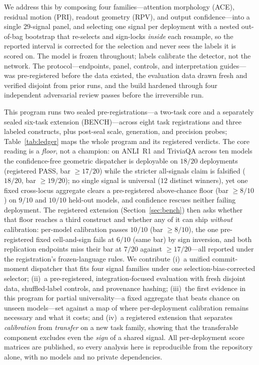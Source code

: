 \documentclass[11pt]{article}
\begin{document}
We address this by composing four families---attention morphology (ACE), residual motion
(PRI), readout geometry (RPV), and output confidence---into a single $29$-signal panel, and
selecting one signal per deployment with a nested out-of-bag bootstrap that re-selects and
sign-locks \emph{inside} each resample, so the reported interval is corrected for the selection
and never sees the labels it is scored on. The model is frozen throughout; labels calibrate the
detector, not the network. The protocol---endpoints, panel, controls, and interpretation
guides---was pre-registered before the data existed, the evaluation data drawn fresh and verified
disjoint from prior runs, and the build hardened through four independent adversarial review
passes before the irreversible run.

This program runs two sealed pre-registrations---a two-task core and a separately sealed six-task
extension (BENCH)---across eight task registrations and three labeled constructs, plus
post-seal scale, generation, and precision probes; Table~\ref{tab:ledger} maps the whole program and
its registered verdicts. The core reading is a \emph{floor}, not a champion: on ANLI~R1 and TriviaQA
across ten models the confidence-free geometric dispatcher is deployable on $18/20$ deployments
(registered PASS, bar $\geq 17/20$) while the stricter all-signals claim is falsified ($18/20$, bar
$\geq 19/20$); no single signal is universal ($12$ distinct winners), yet one fixed cross-locus
aggregate clears a pre-registered above-chance floor (bar $\geq 8/10$) on $9/10$ and $10/10$ held-out
models, and confidence rescues neither failing deployment. The registered extension
(Section~\ref{sec:bench}) then asks whether that floor reaches a third construct and whether any of it
can ship \emph{without} calibration: per-model calibration passes $10/10$ (bar $\geq 8/10$), the one
pre-registered fixed cell-and-sign fails at $6/10$ (same bar) by sign inversion, and both replication
endpoints miss their bar at $7/20$ against $\geq 17/20$---all reported under the registration's
frozen-language rules.
We contribute (i)~a unified commit-moment dispatcher that fits four signal
families under one selection-bias-corrected selector; (ii)~a pre-registered,
integration-focused evaluation with fresh disjoint data, shuffled-label controls, and provenance
hashing; (iii)~the first evidence in this program for partial universality---a fixed aggregate
that beats chance on unseen models---set against a map of where per-deployment calibration
remains necessary and what it costs; and (iv)~a registered extension that separates
\emph{calibration} from \emph{transfer} on a new task family, showing that the transferable
component excludes even the \emph{sign} of a shared signal. All per-deployment score matrices are
published, so every analysis here is reproducible from the repository alone, with no models and no
private dependencies.
\end{document}

